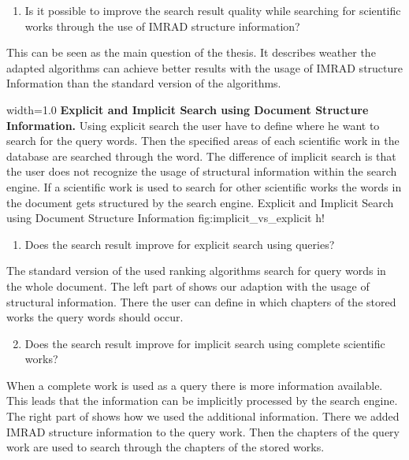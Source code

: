 \begin{enumerate}
  \item Is it possible to improve the search result quality while searching for scientific works through the use of IMRAD structure information?
\end{enumerate}

This can be seen as the main question of the thesis. It describes weather the adapted algorithms can achieve better results with the usage of IMRAD structure Information than the standard version of the algorithms.

      {width=1.0\textwidth}
      {\textbf{Explicit and Implicit Search using Document Structure Information.} Using explicit search the user have to define where he want to search for the query words. Then the specified areas of each scientific work in the database are searched through the word. The difference of implicit search is that the user does not recognize the usage of structural information within the search engine. If a scientific work is used to search for other scientific works the words in the document gets structured by the search engine.}
      {Explicit and Implicit Search using Document Structure Information}
      {fig:implicit_vs_explicit}
      {h!}

\begin{enumerate}[label=1.\arabic*]
  \item Does the search result improve for explicit search using queries?
\end{enumerate}

The standard version of the used ranking algorithms search for query words in the whole document. The left part of  shows our adaption with the usage of structural information. There the user can define in which chapters of the stored works the query words should occur.

\begin{enumerate}[label=1.\arabic*]
  \setcounter{enumi}{1}
  \item Does the search result improve for implicit search using complete scientific works?
\end{enumerate}

When a complete work is used as a query there is more information available. This leads that the information can be implicitly processed by the search engine. The right part of  shows how we used the additional information. There we added IMRAD structure information to the query work. Then the chapters of the query work are used to search through the chapters of the stored works.

